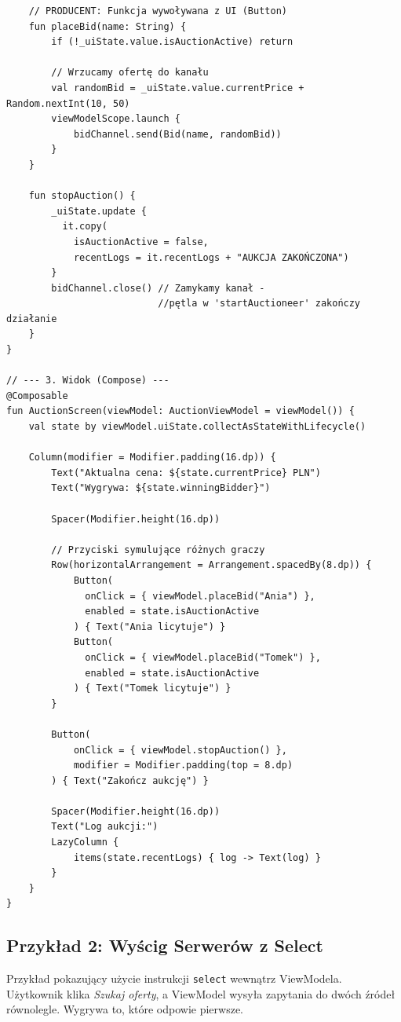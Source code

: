 \begin{verbatim}
    // PRODUCENT: Funkcja wywoływana z UI (Button)
    fun placeBid(name: String) {
        if (!_uiState.value.isAuctionActive) return
        
        // Wrzucamy ofertę do kanału
        val randomBid = _uiState.value.currentPrice + Random.nextInt(10, 50)
        viewModelScope.launch {
            bidChannel.send(Bid(name, randomBid))
        }
    }

    fun stopAuction() {
        _uiState.update { 
          it.copy(
            isAuctionActive = false, 
            recentLogs = it.recentLogs + "AUKCJA ZAKOŃCZONA") 
        }
        bidChannel.close() // Zamykamy kanał - 
                           //pętla w 'startAuctioneer' zakończy działanie
    }
}

// --- 3. Widok (Compose) ---
@Composable
fun AuctionScreen(viewModel: AuctionViewModel = viewModel()) {
    val state by viewModel.uiState.collectAsStateWithLifecycle()

    Column(modifier = Modifier.padding(16.dp)) {
        Text("Aktualna cena: ${state.currentPrice} PLN")
        Text("Wygrywa: ${state.winningBidder}")
        
        Spacer(Modifier.height(16.dp))
        
        // Przyciski symulujące różnych graczy
        Row(horizontalArrangement = Arrangement.spacedBy(8.dp)) {
            Button(
              onClick = { viewModel.placeBid("Ania") }, 
              enabled = state.isAuctionActive
            ) { Text("Ania licytuje") }
            Button(
              onClick = { viewModel.placeBid("Tomek") }, 
              enabled = state.isAuctionActive
            ) { Text("Tomek licytuje") }
        }
        
        Button(
            onClick = { viewModel.stopAuction() }, 
            modifier = Modifier.padding(top = 8.dp)
        ) { Text("Zakończ aukcję") }

        Spacer(Modifier.height(16.dp))
        Text("Log aukcji:")
        LazyColumn {
            items(state.recentLogs) { log -> Text(log) }
        }
    }
}
\end{verbatim}

\subsection{Przykład 2: Wyścig Serwerów z Select}

Przykład pokazujący użycie instrukcji \texttt{select} wewnątrz ViewModela. Użytkownik klika \textit{Szukaj oferty}, a ViewModel wysyła zapytania do dwóch źródeł równolegle. Wygrywa to, które odpowie pierwsze.

